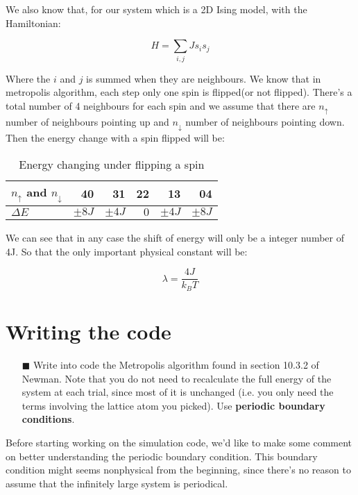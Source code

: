 \documentclass[11pt]{article}
\begin{document}
We also know that, for our system which is a 2D Ising model, with the Hamiltonian:

\begin{equation}
    H = \sum_{i,j} J s_i s_j
\end{equation}

Where the $i$ and $j$ is summed when they are neighbours. We know that in metropolis algorithm, each step only one spin is flipped(or not flipped). There's a total number of 4 neighbours for each spin and we assume that there are $n_{\uparrow}$ number of neighbours pointing up and $n_{\downarrow}$ number of neighbours pointing down. Then the energy change with a spin flipped will be:

\begin{table}[htbp]
    \centering
    \caption{Energy changing under flipping a spin}
      \begin{tabular}{|l|r|r|r|r|r|}
      \hline
       $n_{\uparrow}$ and $n_{\downarrow}$    & 40   & 31   & 22   & 13   & 04 \\
      \hline
      $\Delta E$ &  $\pm 8J$    &   $\pm 4J$   &   $0$   &   $\pm 4J$   & $ \pm 8J$\\
      \hline
      \end{tabular}%
    \label{tab:addlabel}%
\end{table}%

We can see that in any case the shift of energy will only be a integer number of 4J. So that the only important physical constant will be:

\begin{equation}
    \lambda = \frac{4J}{k_BT}
\end{equation}

\section{Writing the code}
\begin{itemize}
    \item[$\blacksquare$] Write into code the Metropolis algorithm found in section 10.3.2 of Newman. Note that you do not need to recalculate the full energy of the system at each trial, since most of it is unchanged (i.e. you only need the terms involving the lattice atom you picked). Use \textbf{periodic boundary conditions}.
\end{itemize}

Before starting working on the simulation code, we'd like to make some comment on better understanding the periodic boundary condition. This boundary condition might seems nonphysical from the beginning, since there's no reason to assume that the infinitely large system is periodical. 
\end{document}
